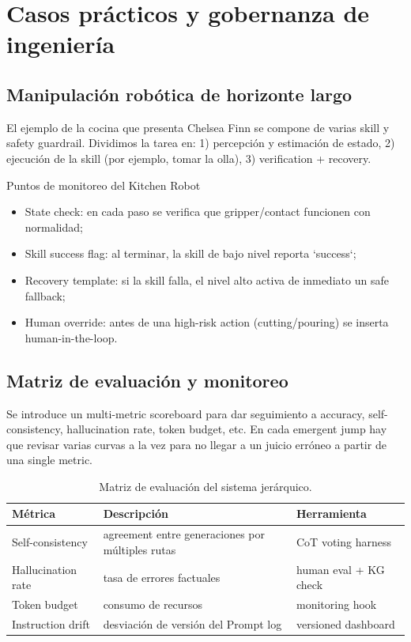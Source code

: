 \section{Casos prácticos y gobernanza de ingeniería}

\subsection{Manipulación robótica de horizonte largo}

El ejemplo de la cocina que presenta Chelsea Finn se compone de varias skill y safety guardrail. Dividimos la tarea en: 1) percepción y estimación de estado, 2) ejecución de la skill (por ejemplo, tomar la olla), 3) verification + recovery.

\begin{knowledgebox}{Puntos de monitoreo del Kitchen Robot}
\begin{itemize}
    \item State check: en cada paso se verifica que gripper/contact funcionen con normalidad;
    \item Skill success flag: al terminar, la skill de bajo nivel reporta `success`;
    \item Recovery template: si la skill falla, el nivel alto activa de inmediato un safe fallback;
    \item Human override: antes de una high-risk action (cutting/pouring) se inserta human-in-the-loop.
\end{itemize}
\end{knowledgebox}

\subsection{Matriz de evaluación y monitoreo}

Se introduce un multi-metric scoreboard para dar seguimiento a accuracy, self-consistency, hallucination rate, token budget, etc. En cada emergent jump hay que revisar varias curvas a la vez para no llegar a un juicio erróneo a partir de una single metric.

\begin{table}[H]
\centering
\begin{tabular}{p{3.5cm}p{5cm}p{3cm}}
\toprule
Métrica & Descripción & Herramienta \\
\midrule
Self-consistency & agreement entre generaciones por múltiples rutas & CoT voting harness \\
Hallucination rate & tasa de errores factuales & human eval + KG check \\
Token budget & consumo de recursos & monitoring hook \\
Instruction drift & desviación de versión del Prompt log & versioned dashboard \\
\bottomrule
\end{tabular}
\caption{Matriz de evaluación del sistema jerárquico.}
\end{table}


